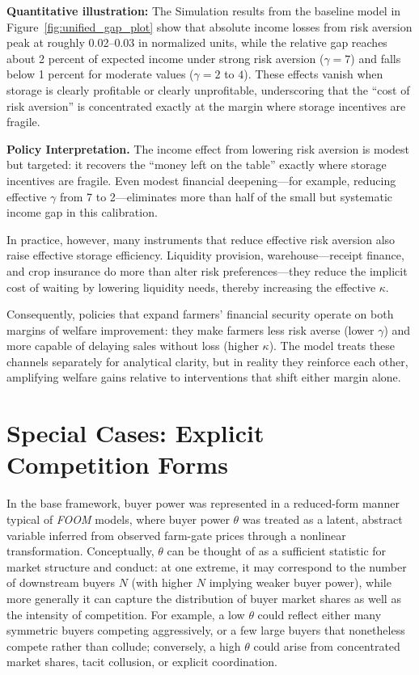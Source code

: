 \textbf{Quantitative illustration:} The Simulation results from the baseline model in Figure~\ref{fig:unified_gap_plot} show that absolute income losses from risk aversion peak at roughly 0.02--0.03 in normalized units, while the relative gap reaches about 2 percent of expected income under strong risk aversion ($\gamma=7$) and falls below 1 percent for moderate values ($\gamma=2$ to $4$). These effects vanish when storage is clearly profitable or clearly unprofitable, underscoring that the ``cost of risk aversion'' is concentrated exactly at the margin where storage incentives are fragile.


\textbf{Policy Interpretation.} 
The income effect from lowering risk aversion is modest but targeted: it recovers the ``money left on the table'' exactly where storage incentives are fragile. Even modest financial deepening---for example, reducing effective $\gamma$ from 7 to 2---eliminates more than half of the small but systematic income gap in this calibration. 

In practice, however, many instruments that reduce effective risk aversion also raise effective storage efficiency. Liquidity provision, warehouse---receipt finance, and crop insurance do more than alter risk preferences---they reduce the implicit cost of waiting by lowering liquidity needs, thereby increasing the effective $\kappa$.

Consequently, policies that expand farmers' financial security operate on both margins of welfare improvement: they make farmers less risk averse (lower $\gamma$) and more capable of delaying sales without loss (higher $\kappa$). The model treats these channels separately for analytical clarity, but in reality they reinforce each other, amplifying welfare gains relative to interventions that shift either margin alone.












\section{Special Cases: Explicit Competition Forms}\label{Section: Special Cases: Explicit Competition Forms}
\noindent In the base framework, buyer power was represented in a reduced-form manner typical of \textit{FOOM} models, where buyer power $\theta$ was treated as a latent, abstract variable inferred from observed farm-gate prices through a nonlinear transformation. Conceptually, $\theta$ can be thought of as a sufficient statistic for market structure and conduct: at one extreme, it may correspond to the number of downstream buyers $N$ (with higher $N$ implying weaker buyer power), while more generally it can capture the distribution of buyer market shares as well as the intensity of competition. For example, a low $\theta$ could reflect either many symmetric buyers competing aggressively, or a few large buyers that nonetheless compete rather than collude; conversely, a high $\theta$ could arise from concentrated market shares, tacit collusion, or explicit coordination. 

